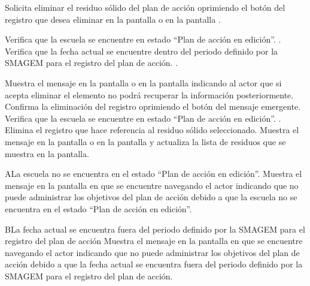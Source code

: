  \begin{UCtrayectoria}
\UCpaso[\UCactor] Solicita eliminar el residuo sólido del plan de acción oprimiendo el botón \botKo  del registro que desea eliminar en la pantalla  o en la pantalla .

	\UCpaso[\UCsist] Verifica que la escuela se encuentre en  estado ``Plan de acción en edición''. .
    \UCpaso[\UCsist] Verifica que la fecha actual se encuentre dentro del periodo definido por la SMAGEM para el registro del plan de acción. .


\UCpaso[\UCsist] Muestra el mensaje  en la pantalla  o en la pantalla  indicando al actor que si acepta eliminar 
el elemento no podrá recuperar la información posteriormente.
\UCpaso[\UCactor] Confirma la eliminación del registro oprimiendo el botón  del mensaje emergente. 
\UCpaso[\UCsist] Verifica que la escuela se encuentre en  estado ``Plan de acción en edición''. .
\UCpaso[\UCsist] Elimina el registro que hace referencia al residuo sólido seleccionado.
\UCpaso[\UCsist] Muestra el mensaje  en la pantalla  
 o en la pantalla  y actualiza la lista de residuos que se muestra en la pantalla.
 \end{UCtrayectoria}
 
\begin{UCtrayectoriaA}{A}{La escuela no se encuentra en el estado ``Plan de acción en edición''.}
    \UCpaso[\UCsist] Muestra el mensaje  en la pantalla en que se encuentre navegando el actor indicando que no puede administrar los objetivos del plan de acción debido a que la escuela no se encuentra en el estado ``Plan de acción en edición''. 
 \end{UCtrayectoriaA}
 
   \begin{UCtrayectoriaA}{B}{La fecha actual se encuentra fuera del periodo definido por la SMAGEM para el registro del plan de acción}
    \UCpaso[\UCsist] Muestra el mensaje  en la pantalla en que se encuentre navegando el actor indicando que no puede administrar los objetivos del plan de acción debido a que la fecha actual se encuentra fuera del periodo definido por la SMAGEM para el registro del plan de acción.
 \end{UCtrayectoriaA} 
 
